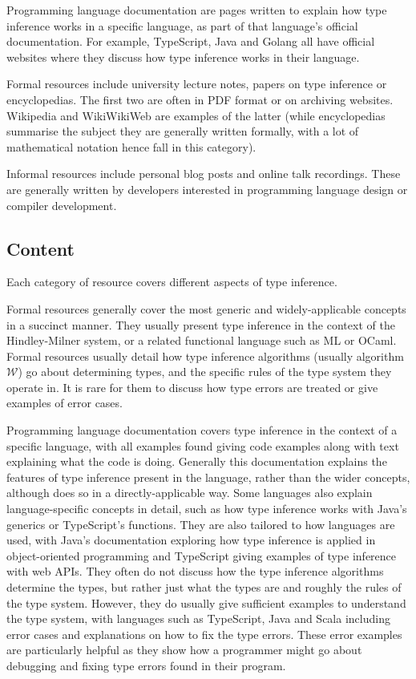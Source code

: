 \documentclass[a4paper,fleqn,oneside,12pt]{report}
\newcommand{\W}{$\mathcal{W}$}
\begin{document}
Programming language documentation are pages written to explain how type inference works in a specific language, as part of that language’s official documentation. For example, TypeScript, Java and Golang all have official websites where they discuss how type inference works in their language.

Formal resources include university lecture notes, papers on type inference or encyclopedias. The first two are often in PDF format or on archiving websites. Wikipedia and WikiWikiWeb are examples of the latter (while encyclopedias summarise the subject they are generally written formally, with a lot of mathematical notation hence fall in this category).

Informal resources include personal blog posts and online talk recordings. These are generally written by developers interested in programming language design or compiler development.

\subsection{Content}

Each category of resource covers different aspects of type inference.

Formal resources generally cover the most generic and widely-applicable concepts in a succinct manner. They usually present type inference in the context of the Hindley-Milner system, or a related functional language such as ML or OCaml. Formal resources usually detail how type inference algorithms (usually algorithm \W) go about determining types, and the specific rules of the type system they operate in. It is rare for them to discuss how type errors are treated or give examples of error cases.

Programming language documentation covers type inference in the context of a specific language, with all examples found giving code examples along with text explaining what the code is doing. Generally this documentation explains the features of type inference present in the language, rather than the wider concepts, although does so in a directly-applicable way. Some languages also explain language-specific concepts in detail, such as how type inference works with Java’s generics or TypeScript’s functions. They are also tailored to how languages are used, with Java’s documentation exploring how type inference is applied in object-oriented programming and TypeScript giving examples of type inference with web APIs. They often do not discuss how the type inference algorithms determine the types, but rather just what the types are and roughly the rules of the type system. However, they do usually give sufficient examples to understand the type system, with languages such as TypeScript, Java and Scala including error cases and explanations on how to fix the type errors. These error examples are particularly helpful as they show how a programmer might go about debugging and fixing type errors found in their program.
\end{document}
